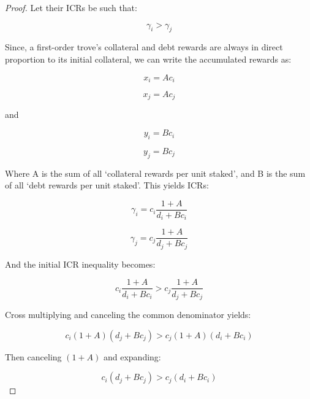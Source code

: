 \documentclass[reqno]{article}
\begin{document}
\begin{proof}
Let their ICRs be such that:

\begin{equation} 
    \gamma_i > \gamma_j
\end{equation}

\bigskip
Since, a first-order trove’s collateral and debt rewards are always in direct proportion to its initial collateral, we can write the accumulated rewards as:

\begin{equation} 
    x_i=Ac_i
\end{equation}

\begin{equation} 
    x_j=Ac_j
\end{equation}

and

\begin{equation} 
    y_i=Bc_i
\end{equation}

\begin{equation} 
    y_j=Bc_j
\end{equation}

\bigskip
Where A is the sum of all ‘collateral rewards per unit staked’, and B is the sum of all ‘debt rewards per unit staked’. This yields ICRs:

\begin{equation} 
    \gamma_i=c_i\frac{1+A}{d_i+Bc_i}
\end{equation}

\begin{equation} 
    \gamma_j=c_j\frac{1+A}{d_j+Bc_j}
\end{equation}

And the initial ICR inequality becomes:

\begin{equation} 
    c_i\frac{1+A}{d_i+Bc_i}>c_j\frac{1+A}{d_j+Bc_j}
\end{equation}

\bigskip
Cross multiplying and canceling the common denominator yields:

\begin{equation} 
    c_i\left(1+A\right)\left(d_j+Bc_j\right)>c_j\left(1+A\right)\left(d_i+Bc_i\right)
\end{equation}

Then canceling $(1+A)$ and expanding:

\begin{equation} 
    c_i\left(d_j+Bc_j\right)>c_j\left(d_i+Bc_i\right)
\end{equation}


\end{proof}
\end{document}
